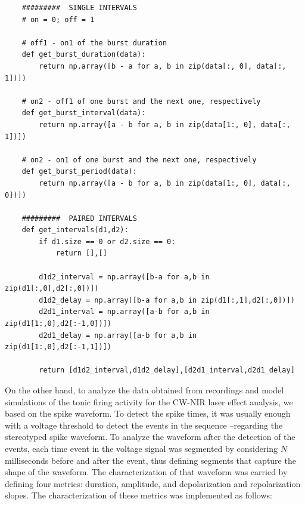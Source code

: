 
\begin{lstlisting}
	#########  SINGLE INTERVALS
	# on = 0; off = 1
	
	# off1 - on1 of the burst duration
	def get_burst_duration(data):
		return np.array([b - a for a, b in zip(data[:, 0], data[:, 1])])
	
	# on2 - off1 of one burst and the next one, respectively
	def get_burst_interval(data):
		return np.array([a - b for a, b in zip(data[1:, 0], data[:, 1])])
		
	# on2 - on1 of one burst and the next one, respectively
	def get_burst_period(data):
		return np.array([a - b for a, b in zip(data[1:, 0], data[:, 0])])
		
	#########  PAIRED INTERVALS
	def get_intervals(d1,d2):
		if d1.size == 0 or d2.size == 0:
			return [],[]
			
		d1d2_interval = np.array([b-a for a,b in zip(d1[:,0],d2[:,0])])
		d1d2_delay = np.array([b-a for a,b in zip(d1[:,1],d2[:,0])])
		d2d1_interval = np.array([a-b for a,b in zip(d1[1:,0],d2[:-1,0])])
		d2d1_delay = np.array([a-b for a,b in zip(d1[1:,0],d2[:-1,1])])
	
		return [d1d2_interval,d1d2_delay],[d2d1_interval,d2d1_delay]
\end{lstlisting}

On the other hand, to analyze the data obtained from recordings and model simulations of the tonic firing activity for the CW-NIR laser effect analysis, we based on the spike waveform. To detect the spike times, it was usually enough with a voltage threshold to detect the events in the sequence --regarding the stereotyped spike waveform. To analyze the waveform after the detection of the events, each time event in the voltage signal was segmented by considering $N$ milliseconds before and after the event, thus defining segments that capture the shape of the waveform. The characterization of that waveform was carried by defining four metrics: duration, amplitude, and depolarization and repolarization slopes. The characterization of these metrics was implemented as follows:

